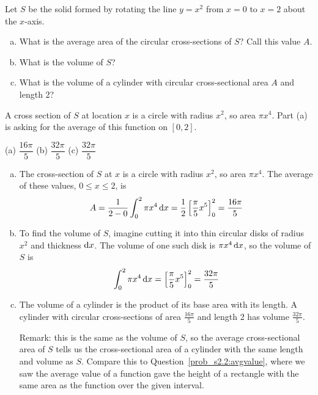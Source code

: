

\begin{question}\label{prob_s2.2:avgarea}
Let $S$ be the solid formed by rotating the line $y=x^2$ from $x=0$ to $x=2$ about the $x$-axis.
\begin{enumerate}[(a)]
\item What is the average area of the circular cross-sections of $S$? Call this value $A$.
\item What is the volume of $S$?
\item What is the volume of a cylinder with circular cross-sectional area $A$ and length 2?
\end{enumerate}
\end{question}
\begin{hint}
A cross section of $S$ at location $x$ is a circle with radius $x^2$, so area $\pi x^4$. Part (a) is asking for the average of this function on $[0,2]$.
\end{hint}
\begin{answer}
(a) $\dfrac{16\pi}{5}$\qquad
(b) $\dfrac{32\pi}{5}$\qquad
(c) $\dfrac{32\pi}{5}$
\end{answer}
\begin{solution}
\begin{enumerate}[(a)]
\item The  cross-section of $S$ at $x$ is a circle with radius $x^2$, so area $\pi x^4$. The average of these values, $0 \leq x \leq 2$, is
\[A = \frac{1}{2-0}\int_0^2 \pi x^4\,\mathrm{d}x = \frac{1}{2}\left[\frac{\pi}{5}x^5\right]_0^2=\frac{16\pi}{5}\]
\item To find the volume of $S$, imagine cutting it into thin circular disks of radius $x^2$ and thickness $\mathrm{d}x$. The volume of one such disk is $\pi x^4\,\mathrm{d}x$, so the volume of $S$ is
\[\int_0^2 \pi x^4\,\mathrm{d}x = \left[\frac{\pi}{5}x^5\right]_0^2 = \frac{32\pi}{5} \]
\item The volume of a cylinder is the product of its base area with its length. A cylinder with circular cross-sections of area $\frac{16\pi}{5}$ and length 2 has volume $\frac{32\pi}{5}$.

Remark: this is the same as the volume of $S$, so the average cross-sectional area  of $S$ tells us the cross-sectional area of a cylinder with the same length and volume as $S$. Compare this to Question~\ref{prob_s2.2:avgvalue}, where we saw the average value of a function gave the height of a rectangle with the same area as the function over the given interval.
\end{enumerate}
\end{solution}

